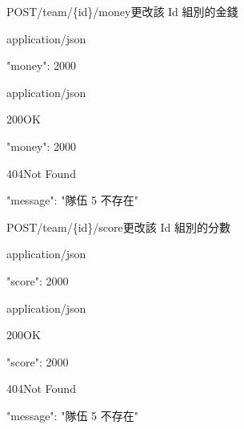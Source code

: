 \documentclass[12pt]{NGPLB}
\begin{document}
\begin{apiRoute}{POST}{/team/\{id\}/money}{更改該 Id 組別的金錢}
\begin{routeParameter}
\end{routeParameter}
\begin{routeRequest}{application/json}
\begin{routeRequestBody}
{
	"money": 2000
}
\end{routeRequestBody}
\end{routeRequest}
\begin{routeResponse}{application/json}
\begin{routeResponseItem}{200}{OK}
\begin{routeResponseItemBody}
{
	"money": 2000
}
\end{routeResponseItemBody}
\end{routeResponseItem}

\begin{routeResponseItem}{404}{Not Found}
\begin{routeResponseItemBody}
{
    "message": "隊伍 5 不存在"
}
\end{routeResponseItemBody}
\end{routeResponseItem}
\end{routeResponse}
\end{apiRoute}

\begin{apiRoute}{POST}{/team/\{id\}/score}{更改該 Id 組別的分數}
\begin{routeParameter}
\end{routeParameter}
\begin{routeRequest}{application/json}
\begin{routeRequestBody}
{
	"score": 2000
}
\end{routeRequestBody}
\end{routeRequest}
\begin{routeResponse}{application/json}
\begin{routeResponseItem}{200}{OK}
\begin{routeResponseItemBody}
{
	"score": 2000
}
\end{routeResponseItemBody}
\end{routeResponseItem}

\begin{routeResponseItem}{404}{Not Found}
\begin{routeResponseItemBody}
{
    "message": "隊伍 5 不存在"
}
\end{routeResponseItemBody}
\end{routeResponseItem}
\end{routeResponse}
\end{apiRoute}
\end{document}
